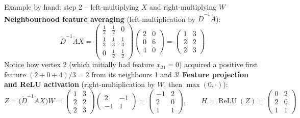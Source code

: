 \documentclass[aspectratio=169]{beamer}\usepackage[]{graphicx}\usepackage[]{xcolor}
\begin{document}
\begin{frame}{Example by hand: step 2 -- left-multiplying $X$ and right-multiplying $W$}
\textbf{Neighbourhood feature averaging} (left-multiplication by $\tilde{D}^{-1}\tilde{A}$):
\[
\tilde{D}^{-1}\tilde{A} X =
\begin{pmatrix}
\frac{1}{2} & \frac{1}{2} & 0 \\[2pt]
\frac{1}{3} & \frac{1}{3} & \frac{1}{3} \\[2pt]
0 & \frac{1}{2} & \frac{1}{2}
\end{pmatrix}
\begin{pmatrix} 2 & 0 \\ 0 & 6 \\ 4 & 0 \end{pmatrix}
=
\begin{pmatrix} 1 & 3 \\ 2 & 2 \\ 2 & 3 \end{pmatrix}
\]
Notice how vertex 2 (which initially had feature $x_{21} = 0$) acquired a positive first feature $(2+0+4)/3 = 2$ from its neighbours 1 and 3!
\vfill
\textbf{Feature projection and ReLU activation} (right-multiplication by $W$, then $\max(0, \cdot)$):
\[
Z = \big(\tilde{D}^{-1}\tilde{A} X\big) W =
\begin{pmatrix} 1 & 3 \\ 2 & 2 \\ 2 & 3 \end{pmatrix}
\begin{pmatrix} 2 & -1 \\ -1 & 1 \end{pmatrix}
=
\begin{pmatrix} -1 & 2 \\ 2 & 0 \\ 1 & 1 \end{pmatrix}, \qquad
H = \operatorname{ReLU}(Z) =
\begin{pmatrix} 0 & 2 \\ 2 & 0 \\ 1 & 1 \end{pmatrix}
\]
\end{frame}
\end{document}
